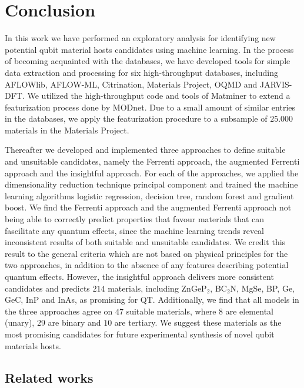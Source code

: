 \chapter*{Conclusion}

In this work we have performed an exploratory analysis for identifying new potential qubit material hosts candidates using machine learning. In the process of becoming acquainted with the databases, we have developed tools for simple data extraction and processing for six high-throughput databases, including AFLOWlib, AFLOW-ML, Citrination, Materials Project, OQMD and JARVIS-DFT. We utilized the high-throughput code and tools of Matminer to extend a featurization process done by MODnet. Due to a small amount of similar entries in the databases, we apply the featurization procedure to a subsample of $25.000$ materials in the Materials Project.

Thereafter we developed and implemented three approaches to define suitable and unsuitable candidates, namely the Ferrenti approach, the augmented Ferrenti approach and the insightful approach. For each of the approaches, we applied the dimensionality reduction technique principal component and trained the machine learning algorithms logistic regression, decision tree, random forest and gradient boost. We find the Ferrenti approach and the augmented Ferrenti approach not being able to correctly predict properties that favour materials that can fascilitate any quantum effects, since the machine learning trends reveal inconsistent results of both suitable and unsuitable candidates. We credit this result to the general criteria which are not based on physical principles for the two approaches, in addition to the absence of any features describing potential quantum effects. However, the insightful approach delivers more consistent candidates and predicts $214$ materials, including ZnGeP$_2$, BC$_2$N, MgSe, BP, Ge, GeC, InP and InAs, as promising for QT. Additionally, we find that all models in the three approaches agree on $47$ suitable materials, where $8$ are elemental (unary), $29$ are binary and $10$ are tertiary. We suggest these materials as the most promising candidates for future experimental synthesis of novel qubit materials hosts. %
\clearpage

\section*{Related works}

